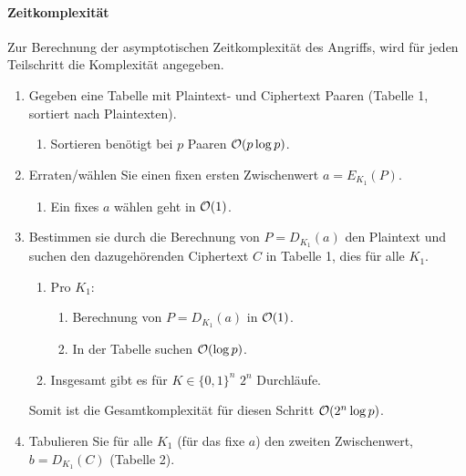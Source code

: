 \paragraph{Zeitkomplexität}
Zur Berechnung der asymptotischen Zeitkomplexität des Angriffs, wird für jeden 
Teilschritt die Komplexität angegeben.
\begin{enumerate}
    \item Gegeben eine Tabelle mit Plaintext- und Ciphertext Paaren
          (Tabelle 1, sortiert nach Plaintexten).
          \begin{enumerate}
            \item Sortieren benötigt bei $p$ Paaren $\mathcal{O} (p\log p)$.
          \end{enumerate}
    \item Erraten/wählen Sie einen fixen ersten Zwischenwert $a = E_{K_1}(P)$.
          \begin{enumerate}
            \item Ein fixes $a$ wählen geht in $\mathcal{O} (1)$.
          \end{enumerate}
    \item Bestimmen sie durch die Berechnung von $P = D_{K_1} (a)$ den
          Plaintext und suchen den dazugehörenden Ciphertext $C$ in Tabelle
          1, dies für alle $K_1$.
          \begin{enumerate}
            \item Pro $K_1$:
            \begin{enumerate}
                \item Berechnung von $P = D_{K_1} (a)$ in $\mathcal{O} (1)$.
                \item In der Tabelle suchen $\mathcal{O} (\log p)$.
            \end{enumerate}
            \item Insgesamt gibt es für $K \in \{0, 1\}^n$ $2^n$ Durchläufe. 
          \end{enumerate}
          Somit ist die Gesamtkomplexität für diesen Schritt $\mathcal{O}(2^n\log p)$.
    \item Tabulieren Sie für alle $K_1$ (für das fixe $a$) den zweiten
          Zwischenwert, $b = D_{K_1} (C)$ (Tabelle 2).\vspace*{1em}\\

\end{enumerate}
